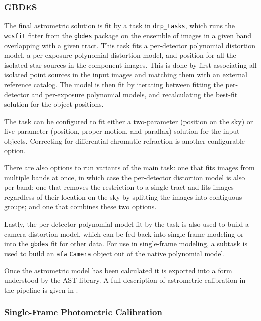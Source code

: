 \subsubsection{GBDES}
\label{sec:gbdes}

The final astrometric solution is fit by a task in \texttt{drp\_tasks}, which runs the \texttt{wcsfit} fitter from the \texttt{gbdes} package \citep{2022ascl.soft10011B,2017PASP..129g4503B} on the ensemble of images in a given band overlapping with a given tract.
This task fits a per-detector polynomial distortion model, a per-exposure polynomial distortion model, and position for all the isolated star sources in the component images.
This is done by first associating all isolated point sources in the input images and matching them with an external reference catalog.
The model is then fit by iterating between fitting the per-detector and per-exposure polynomial models, and recalculating the best-fit solution for the object positions.

The task can be configured to fit either a two-parameter (position on the sky) or five-parameter (position, proper motion, and parallax) solution for the input objects.
Correcting for differential chromatic refraction is another configurable option.

There are also options to run variants of the main task: one that fits images from multiple bands at once, in which case the per-detector distortion model is also per-band; one that removes the restriction to a single tract and fits images regardless of their location on the sky by splitting the images into contiguous groups; and one that combines these two options.

Lastly, the per-detector polynomial model fit by the task is also used to build a camera distortion model, which can be fed back into single-frame modeling or into the \texttt{gbdes} fit for other data.
For use in single-frame modeling, a subtask is used to build an \texttt{afw} \texttt{Camera} object out of the native polynomial model.

Once the astrometric model has been calculated it is exported into a form understood by the AST library.
A full description of astrometric calibration in the pipeline is given in \citet{DMTN-266}.

\subsubsection{Single-Frame Photometric Calibration}
\label{sec:photoCal}

